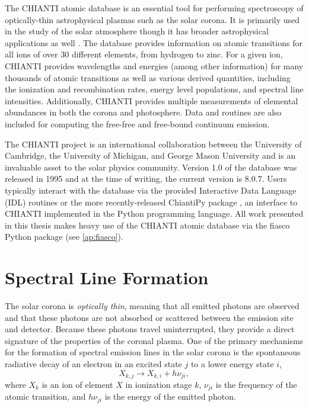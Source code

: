 The CHIANTI atomic database \citep{dere_chianti_1997,young_chianti_1998,landi_chianti_1999,dere_chianti-atomic_2001,landi_chianti-atomic_2002,young_chianti-atomic_2003,landi_chianti-atomic_2006,landi_chianti-atomic_2006-1,dere_chianti_2009,landi_chiantiatomic_2009,young_chiantiatomic_2009,landi_chiantiatomic_2012,landi_chiantiatomic_2013,del_zanna_chianti_2015,young_chianti_2016} is an essential tool for performing spectroscopy of optically-thin astrophysical plasmas such as the solar corona. It is primarily used in the study of the solar atmosphere though it has broader astrophysical applications as well \citep[see Figure 4 of][]{young_chianti_2016}. The database provides information on atomic transitions for all ions of over 30 different elements, from hydrogen to zinc. For a given ion, CHIANTI provides wavelengths and energies (among other information) for many thousands of atomic transitions as well as various derived quantities, including the ionization and recombination rates, energy level populations, and spectral line intensities. Additionally, CHIANTI provides multiple measurements of elemental abundances in both the corona and photosphere. Data and routines are also included for computing the free-free and free-bound continuum emission. 

The CHIANTI project is an international collaboration between the University of Cambridge, the University of Michigan, and George Mason University and is an invaluable asset to the solar physics community. Version 1.0 of the database was released in 1995 and at the time of writing, the current version is 8.0.7. Users typically interact with the database via the provided Interactive Data Language (IDL) routines or the more recently-released ChiantiPy package \citep{landi_chiantiatomic_2012,barnes_chiantipy_2017}, an interface to CHIANTI implemented in the Python programming language. All work presented in this thesis makes heavy use of the CHIANTI atomic database via the fiasco Python package (see \autoref{ap:fiasco}).

\section{Spectral Line Formation}\label{sec:line_formation}

The solar corona is \textit{optically thin}, meaning that all emitted photons are observed and that these photons are not absorbed or scattered between the emission site and detector. Because these photons travel uninterrupted, they provide a direct signature of the properties of the coronal plasma. One of the primary mechanisms for the formation of spectral emission lines in the solar corona is the spontaneous radiative decay of an electron in an excited state $j$ to a lower energy state $i$,
\begin{equation}\label{eq:radiative_decay}
    X_{k,j} \to X_{k,i} + h\nu_{ji},
\end{equation}
where $X_k$ is an ion of element $X$ in ionization stage $k$, $\nu_{ji}$ is the frequency of the atomic transition, and $h\nu_{ji}$ is the energy of the emitted photon.

